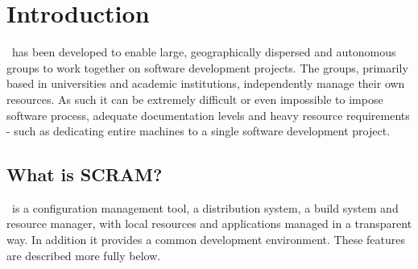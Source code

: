 \chapter{Introduction}\label{ch:intro}
\scram\ has been developed to enable large, geographically dispersed
and autonomous groups to work together on software development
projects. The groups, primarily based in universities and academic
institutions, independently manage their own resources. As such it can
be extremely difficult or even impossible to impose software process,
adequate documentation levels and heavy resource requirements - such
as dedicating entire machines to a single software development
project.

\section{What is SCRAM?}

\scram\ is a configuration management tool, a distribution system, a
build system and resource manager, with local resources and
applications managed in a transparent way. In addition it provides a
common development environment. These features are described more
fully below.

